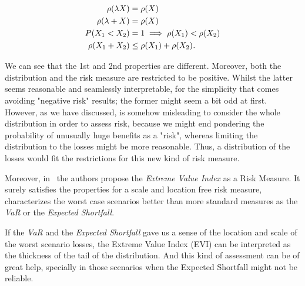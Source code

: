 \begin{align}
\begin{split}
    \rho(\lambda X) &= \rho(X) \\
    \rho(\lambda + X) &= \rho(X) \\
    P(X_1 < X_2) &= 1 \implies \rho(X_1) < \rho(X_2) \\
    \rho(X_1 + X_2) &\leq \rho(X_1) + \rho(X_2) \emph{.}
\end{split}
\end{align}

We can see that the 1st and 2nd properties are different. Moreover, both the distribution and the risk measure are restricted to be positive. Whilst the latter seems reasonable and seamlessly interpretable, for the simplicity that comes avoiding "negative risk" results; the former might seem a bit odd at first. However, as we have discussed, is somehow misleading to consider the whole distribution in order to assess risk, because we might end pondering the probability of unusually huge benefits as a "risk", whereas limiting the distribution to the losses might be more reasonable. Thus, a distribution of the losses would fit the restrictions for this new kind of risk measure.

Moreover, in~\cite{a:iserra-risk} the authors propose the \emph{Extreme Value Index} as a Risk Measure. It surely satisfies the properties for a scale and location free risk measure, characterizes the worst case scenarios better than more standard measures as the \emph{VaR} or the \emph{Expected Shortfall}.

If the \emph{VaR} and the \emph{Expected Shortfall} gave us a sense of the location and scale of the worst scenario losses, the Extreme Value Index (EVI) can be interpreted as the thickness of the tail of the distribution. And this kind of assessment can be of great help, specially in those scenarios when the Expected Shortfall might not be reliable.

